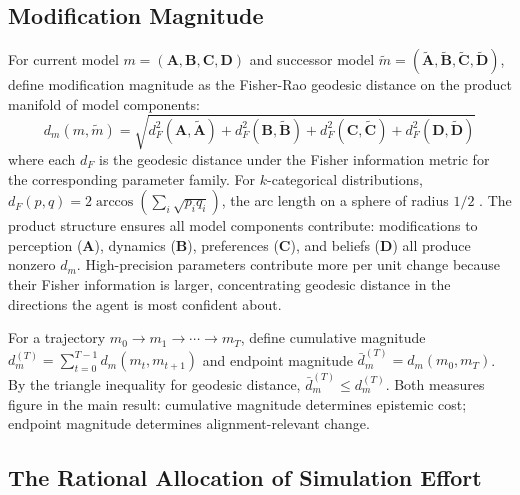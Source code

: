 \documentclass[runningheads]{llncs}
\begin{document}
\subsection{Modification Magnitude}

\begin{definition}
\label{def:magnitude}
For current model $m = (\mathbf{A}, \mathbf{B}, \mathbf{C}, \mathbf{D})$ and successor model $\tilde{m} = (\tilde{\mathbf{A}}, \tilde{\mathbf{B}}, \tilde{\mathbf{C}}, \tilde{\mathbf{D}})$, define modification magnitude as the Fisher-Rao geodesic distance on the product manifold of model components:
\begin{equation}
d_m(m, \tilde{m}) = \sqrt{d_F^2(\mathbf{A}, \tilde{\mathbf{A}}) + d_F^2(\mathbf{B}, \tilde{\mathbf{B}}) + d_F^2(\mathbf{C}, \tilde{\mathbf{C}}) + d_F^2(\mathbf{D}, \tilde{\mathbf{D}})}
\end{equation}
where each $d_F$ is the geodesic distance under the Fisher information metric for the corresponding parameter family. For $k$-categorical distributions, $d_F(p,q) = 2\arccos(\sum_i \sqrt{p_i q_i})$, the arc length on a sphere of radius $1/2$ \cite{amari2016,cencov1982}. The product structure ensures all model components contribute: modifications to perception ($\mathbf{A}$), dynamics ($\mathbf{B}$), preferences ($\mathbf{C}$), and beliefs ($\mathbf{D}$) all produce nonzero $d_m$. High-precision parameters contribute more per unit change because their Fisher information is larger, concentrating geodesic distance in the directions the agent is most confident about.
\end{definition}

\begin{definition}
For a trajectory $m_0 \to m_1 \to \cdots \to m_T$, define cumulative magnitude $d_m^{(T)} = \sum_{t=0}^{T-1} d_m(m_t, m_{t+1})$ and endpoint magnitude $\bar{d}_m^{(T)} = d_m(m_0, m_T)$. By the triangle inequality for geodesic distance, $\bar{d}_m^{(T)} \leq d_m^{(T)}$. Both measures figure in the main result: cumulative magnitude determines epistemic cost; endpoint magnitude determines alignment-relevant change.
\end{definition}

\subsection{The Rational Allocation of Simulation Effort}
\label{sec:rational-allocation}
\end{document}
